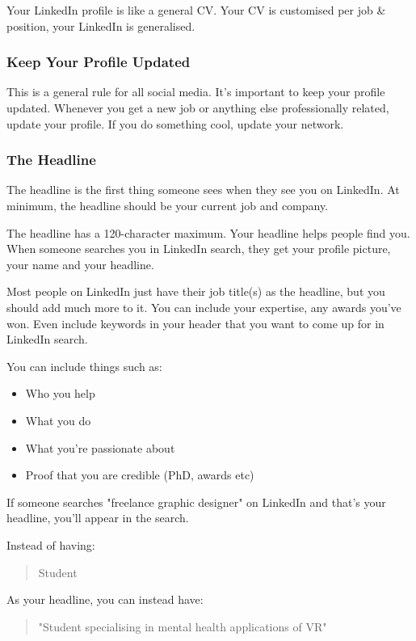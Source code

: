 \documentclass{article}
\begin{document}
Your LinkedIn profile is like a general CV. Your CV is customised per
job \& position, your LinkedIn is generalised.
\subsubsection{Keep Your Profile Updated}
This is a general rule for all social media. It's important to keep your
profile updated. Whenever you get a new job or anything else
professionally related, update your profile. If you do something cool,
update your network.
\subsubsection{The Headline}
The headline is the first thing someone sees when they see you on
LinkedIn. At minimum, the headline should be your current job and
company.

The headline has a 120-character maximum. Your headline helps people
find you. When someone searches you in LinkedIn search, they get your
profile picture, your name and your headline.

Most people on LinkedIn just have their job title(s) as the headline,
but you should add much more to it. You can include your expertise, any
awards you've won. Even include keywords in your header that you want to
come up for in LinkedIn search.

You can include things such as:

\begin{itemize}
\item
  Who you help
\item
  What you do
\item
  What you're passionate about
\item
  Proof that you are credible (PhD, awards etc)
\end{itemize}

If someone searches "freelance graphic designer" on LinkedIn and that's
your headline, you'll appear in the search.

Instead of having:

\begin{quote}Student\end{quote}

As your headline, you can instead have:

\begin{quote}"Student specialising in mental health applications of VR"\end{quote}
\end{document}
